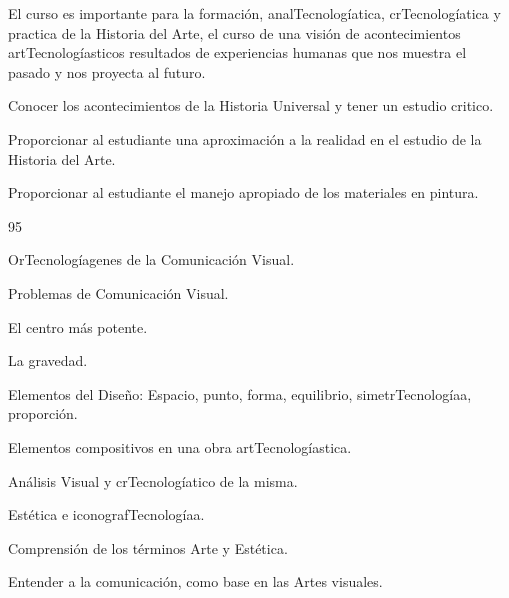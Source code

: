 \begin{syllabus}


\begin{justification}
El curso es importante para la formación, analTecnologíatica, crTecnologíatica y practica de la Historia del Arte, el curso de una visión de acontecimientos artTecnologíasticos resultados de experiencias humanas que nos muestra el pasado y nos proyecta al futuro.
\end{justification}

\begin{goals}
\item Conocer los acontecimientos de la Historia Universal y tener un estudio critico.
\item Proporcionar al estudiante una aproximación a la realidad en el estudio de la Historia del Arte.
\item Proporcionar al estudiante el manejo apropiado de los materiales en pintura.
\end{goals}

\begin{outcomes}
\end{outcomes}

\begin{unit}{}{}{9}{5}
\begin{topics}
	\item OrTecnologíagenes de la Comunicación Visual.
	\item Problemas de Comunicación Visual.
	\item El centro más potente.
	\item La gravedad.
	\item Elementos del Diseño: Espacio, punto, forma, equilibrio, simetrTecnologíaa, proporción.
	\item Elementos compositivos en una obra artTecnologíastica.
	\item Análisis Visual y crTecnologíatico de la misma.
	\item Estética e iconografTecnologíaa.
\end{topics}
\begin{unitgoals}
	\item Comprensión de los términos Arte y Estética.
	\item Entender a la comunicación, como base en las Artes visuales.

\end{unitgoals}
\end{unit}


\end{syllabus}
